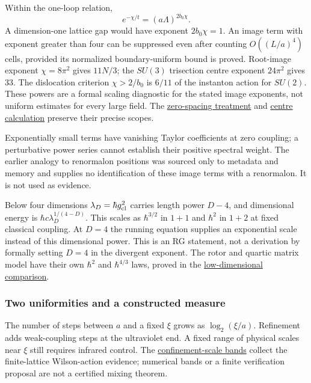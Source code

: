 \documentclass[11pt,a4paper]{article}
\begin{document}
Within the one-loop relation, \[e^{-\chi/t}=(a\Lambda)^{2b_0\chi}.\] A
dimension-one lattice gap would have exponent \(2b_0\chi=1\). An image
term with exponent greater than four can be suppressed even after
counting \(O((L/a)^4)\) cells, provided its normalized boundary-uniform
bound is proved. Root-image exponent \(\chi=8\pi^2\) gives \(11N/3\);
the \(SU(3)\) trisection centre exponent \(24\pi^2\) gives \(33\). The
dislocation criterion \(\chi>2/b_0\) is \(6/11\) of the instanton action
for \(SU(2)\). These powers are a formal scaling diagnostic for the
stated image exponents, not uniform estimates for every large field. The
\href{zero-spacing-any-action.md}{zero-spacing treatment} and
\href{sun-midpoint-centre.md}{centre calculation} preserve their precise
scopes.

Exponentially small terms have vanishing Taylor coefficients at zero
coupling; a perturbative power series cannot establish their positive
spectral weight. The earlier analogy to renormalon positions was sourced
only to metadata and memory and supplies no identification of these
image terms with a renormalon. It is not used as evidence.

Below four dimensions \(\lambda_D=\hbar g_{\rm cl}^2\) carries length
power \(D-4\), and dimensional energy is \(\hbar c\lambda_D^{1/(4-D)}\).
This scales as \(\hbar^{3/2}\) in \(1+1\) and \(\hbar^2\) in \(1+2\) at
fixed classical coupling. At \(D=4\) the running equation supplies an
exponential scale instead of this dimensional power. This is an RG
statement, not a derivation by formally setting \(D=4\) in the divergent
exponent. The rotor and quartic matrix model have their own \(\hbar^2\)
and \(\hbar^{4/3}\) laws, proved in the
\href{low-dimensional-mass-gap.md}{low-dimensional comparison}.

\hypertarget{two-uniformities-and-a-constructed-measure}{%
\subsubsection{Two uniformities and a constructed
measure}\label{two-uniformities-and-a-constructed-measure}}

The number of steps between \(a\) and a fixed \(\xi\) grows as
\(\log_2(\xi/a)\). Refinement adds weak-coupling steps at the
ultraviolet end. A fixed range of physical scales near \(\xi\) still
requires infrared control. The
\href{mass-gap-conditional-theorem.md\#numerical-orientation-and-its-limits}{confinement-scale
bands} collect the finite-lattice Wilson-action evidence; numerical
bands or a finite verification proposal are not a certified mixing
theorem.
\end{document}
